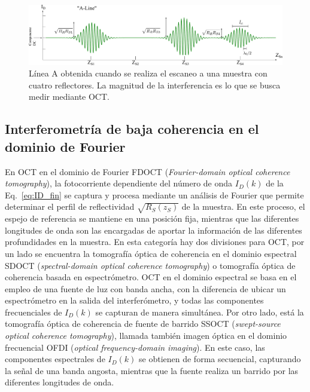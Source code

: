 \begin{figure}[h!]
	\centering
	\includegraphics[width=\linewidth,keepaspectratio]{img/chap2/A_Line_1Gen}
	\caption[Línea A medida con OCT en el dominio temporal]{Línea A obtenida cuando se realiza el escaneo a una muestra con cuatro reflectores. La magnitud de la interferencia es lo que se busca medir mediante OCT.}
	\label{fig:tdoct}
\end{figure}


\subsection{Interferometría de baja coherencia en el dominio de Fourier}
\label{sec:int_baja_coh_fourier}

En OCT en el dominio de Fourier FDOCT (\textit{Fourier-domain optical coherence tomography}), la fotocorriente dependiente del número de onda $I_D(k)$ de la Eq.~\ref{eq:ID_fin} se captura y procesa mediante un análisis de Fourier que permite determinar el perfil de reflectividad $\sqrt{R_S(z_S)}$ de la muestra. En este proceso, el espejo de referencia se mantiene en una posición fija, mientras que las diferentes longitudes de onda son las encargadas de aportar la información de las diferentes profundidades en la muestra. En esta categoría hay dos divisiones para OCT, por un lado se encuentra la tomografía óptica de coherencia en el dominio espectral SDOCT (\textit{spectral-domain optical coherence tomography}) o tomografía óptica de coherencia basada en espectrómetro. OCT en el dominio espectral se basa en el empleo de una fuente de luz con banda ancha, con la diferencia de ubicar un espectrómetro en la salida del interferómetro, y todas las componentes frecuenciales de $I_D(k)$ se capturan de manera simultánea. Por otro lado, está la tomografía óptica de coherencia de fuente de barrido SSOCT (\textit{swept-source optical coherence tomography}), llamada también imagen óptica en el dominio frecuencial OFDI (\textit{optical frequency-domain imaging}). En este caso, las componentes espectrales de $I_D(k)$ se obtienen de forma secuencial, capturando la señal de una banda angosta, mientras que la fuente realiza un barrido por las diferentes longitudes de onda.

